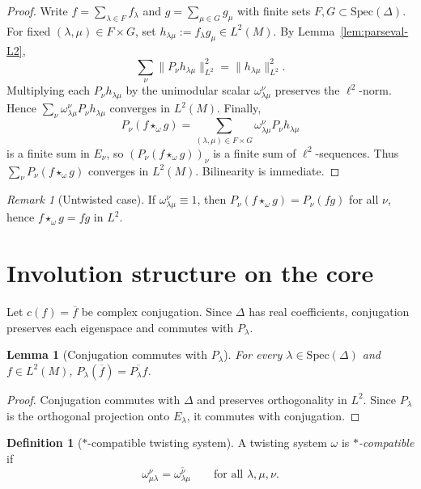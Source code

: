 \documentclass[11pt]{amsart}
\theoremstyle{plain}
\newtheorem{lemma}[theorem]{Lemma}
\theoremstyle{definition}
\newtheorem{definition}[theorem]{Definition}
\theoremstyle{remark}
\newtheorem{remark}[theorem]{Remark}
\newcommand{\Spec}{\mathrm{Spec}}
\begin{document}
\begin{proof}
Write $f=\sum_{\lambda\in F} f_\lambda$ and $g=\sum_{\mu\in G} g_\mu$ with finite sets $F,G\subset\Spec(\Delta)$.
For fixed $(\lambda,\mu)\in F\times G$, set $h_{\lambda\mu}:=f_\lambda g_\mu\in L^2(M)$.
By Lemma~\ref{lem:parseval-L2},
\[ \sum_{\nu}\|P_\nu h_{\lambda\mu}\|_{L^2}^2=\|h_{\lambda\mu}\|_{L^2}^2. \]
Multiplying each $P_\nu h_{\lambda\mu}$ by the unimodular scalar $\omega^{\nu}_{\lambda\mu}$ preserves the $\ell^2$-norm.
Hence $\sum_{\nu} \omega^{\nu}_{\lambda\mu}P_\nu h_{\lambda\mu}$ converges in $L^2(M)$.
Finally,
\[ P_\nu(f\star_\omega g)=\sum_{(\lambda,\mu)\in F\times G} \omega^{\nu}_{\lambda\mu}P_\nu h_{\lambda\mu} \]
is a finite sum in $E_\nu$, so $(P_\nu(f\star_\omega g))_{\nu}$ is a finite sum of $\ell^2$-sequences.
Thus $\sum_\nu P_\nu(f\star_\omega g)$ converges in $L^2(M)$.
Bilinearity is immediate.
\end{proof}

\begin{remark}[Untwisted case]
If $\omega^{\nu}_{\lambda\mu}\equiv 1$, then $P_\nu(f\star_\omega g)=P_\nu(fg)$ for all $\nu$, hence $f\star_\omega g=fg$ in $L^2$.
\end{remark}

\section{Involution structure on the core}

Let $c(f)=\overline f$ be complex conjugation.
Since $\Delta$ has real coefficients, conjugation preserves each eigenspace and commutes with $P_\lambda$.

\begin{lemma}[Conjugation commutes with $P_\lambda$]\label{lem:conj-proj}
For every $\lambda\in\Spec(\Delta)$ and $f\in L^2(M)$, $P_\lambda(\overline f)=\overline{P_\lambda f}$.
\end{lemma}

\begin{proof}
Conjugation commutes with $\Delta$ and preserves orthogonality in $L^2$.
Since $P_\lambda$ is the orthogonal projection onto $E_\lambda$, it commutes with conjugation.
\end{proof}

\begin{definition}[$*$-compatible twisting system]\label{def:star-compat}
A twisting system $\omega$ is \emph{$*$-compatible} if
\[ \omega^{\nu}_{\mu\lambda}=\overline{\omega^{\nu}_{\lambda\mu}}\qquad\text{for all }\lambda,\mu,\nu. \]
\end{definition}
\end{document}
